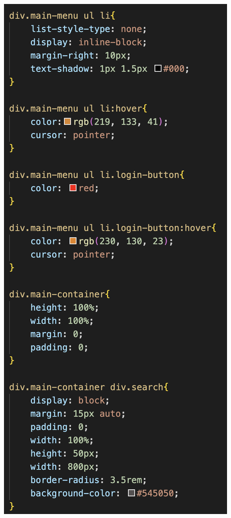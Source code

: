 \documentclass[12pt, letterpaper]{article}
\begin{document}
\begin{center}
	\includegraphics[scale=0.6]{style2}
\end{center}
\end{document}
